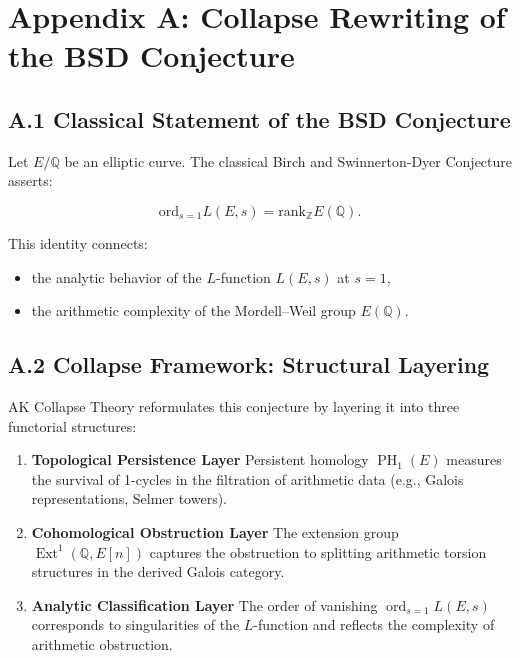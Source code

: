 \documentclass[11pt]{article}
\DeclareMathOperator{\Ext}{Ext}
\DeclareMathOperator{\PH}{PH}
\DeclareMathOperator{\ord}{ord}
\newcommand{\QQ}{\mathbb{Q}}
\newcommand{\ZZ}{\mathbb{Z}}
\begin{document}

\section*{Appendix A: Collapse Rewriting of the BSD Conjecture}

\subsection*{A.1 Classical Statement of the BSD Conjecture}

Let $E/\QQ$ be an elliptic curve.  
The classical Birch and Swinnerton-Dyer Conjecture asserts:

\[
\mathrm{ord}_{s=1} L(E,s) = \mathrm{rank}_{\ZZ} E(\QQ).
\]

This identity connects:
\begin{itemize}
  \item the analytic behavior of the $L$-function $L(E,s)$ at $s = 1$,
  \item the arithmetic complexity of the Mordell–Weil group $E(\QQ)$.
\end{itemize}

\subsection*{A.2 Collapse Framework: Structural Layering}

AK Collapse Theory reformulates this conjecture by layering it into three functorial structures:

\begin{enumerate}
  \item \textbf{Topological Persistence Layer}  
  Persistent homology $\PH_1(E)$ measures the survival of 1-cycles in the filtration of arithmetic data (e.g., Galois representations, Selmer towers).

  \item \textbf{Cohomological Obstruction Layer}  
  The extension group $\Ext^1(\QQ, E[n])$ captures the obstruction to splitting arithmetic torsion structures in the derived Galois category.

  \item \textbf{Analytic Classification Layer}  
  The order of vanishing $\ord_{s=1} L(E,s)$ corresponds to singularities of the $L$-function and reflects the complexity of arithmetic obstruction.
\end{enumerate}
\end{document}
